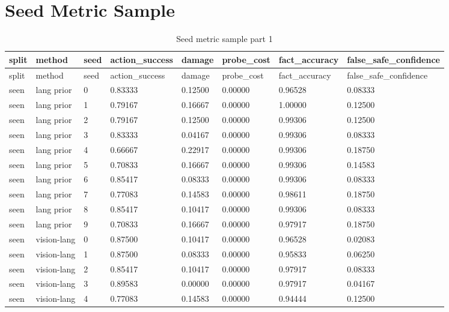 \documentclass{article}
\begin{document}
\clearpage
\section{Seed Metric Sample}

\begin{center}
\tiny
\renewcommand{\arraystretch}{0.92}
\setlength{\tabcolsep}{3pt}
\begin{longtable}{llllllll}
\caption{Seed metric sample part 1}\label{tab:seed-metric-sample-1}\\
\toprule
split & method & seed & action\_success & damage & probe\_cost & fact\_accuracy & false\_safe\_confidence \\
\midrule
\endfirsthead
\toprule
split & method & seed & action\_success & damage & probe\_cost & fact\_accuracy & false\_safe\_confidence \\
\midrule
\endhead
seen & lang prior & 0 & 0.83333 & 0.12500 & 0.00000 & 0.96528 & 0.08333 \\
seen & lang prior & 1 & 0.79167 & 0.16667 & 0.00000 & 1.00000 & 0.12500 \\
seen & lang prior & 2 & 0.79167 & 0.12500 & 0.00000 & 0.99306 & 0.12500 \\
seen & lang prior & 3 & 0.83333 & 0.04167 & 0.00000 & 0.99306 & 0.08333 \\
seen & lang prior & 4 & 0.66667 & 0.22917 & 0.00000 & 0.99306 & 0.18750 \\
seen & lang prior & 5 & 0.70833 & 0.16667 & 0.00000 & 0.99306 & 0.14583 \\
seen & lang prior & 6 & 0.85417 & 0.08333 & 0.00000 & 0.99306 & 0.08333 \\
seen & lang prior & 7 & 0.77083 & 0.14583 & 0.00000 & 0.98611 & 0.18750 \\
seen & lang prior & 8 & 0.85417 & 0.10417 & 0.00000 & 0.99306 & 0.08333 \\
seen & lang prior & 9 & 0.70833 & 0.16667 & 0.00000 & 0.97917 & 0.18750 \\
seen & vision-lang & 0 & 0.87500 & 0.10417 & 0.00000 & 0.96528 & 0.02083 \\
seen & vision-lang & 1 & 0.87500 & 0.08333 & 0.00000 & 0.95833 & 0.06250 \\
seen & vision-lang & 2 & 0.85417 & 0.10417 & 0.00000 & 0.97917 & 0.08333 \\
seen & vision-lang & 3 & 0.89583 & 0.00000 & 0.00000 & 0.97917 & 0.04167 \\
seen & vision-lang & 4 & 0.77083 & 0.14583 & 0.00000 & 0.94444 & 0.12500 \\

\end{longtable}
\end{center}
\end{document}

